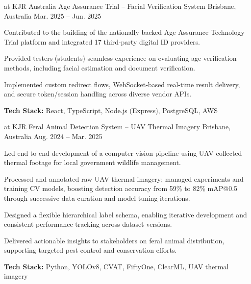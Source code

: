 
\begin{cventries}

  \cventry
    {at KJR} %
    {Australia Age Assurance Trial – Facial Verification System} %
    {Brisbane, Australia} %
    {Mar. 2025 – Jun. 2025} %
    {
      \begin{cvitems}
        \item {Contributed to the building of the nationally backed Age Assurance Technology Trial platform and integrated 17 third-party digital ID providers.}
        \item {Provided testers (students) seamless experience on evaluating age verification methods, including facial estimation and document verification.}  
        \item {Implemented custom redirect flows, WebSocket-based real-time result delivery, and secure token/session handling across diverse vendor APIs.}
        \item {\textbf{Tech Stack:} React, TypeScript, Node.js (Express), PostgreSQL, AWS}
      \end{cvitems}
    }

  \cventry
    {at KJR} %
    {Feral Animal Detection System – UAV Thermal Imagery} %
    {Brisbane, Australia} %
    {Aug. 2024 – Mar. 2025} %
    {
      \begin{cvitems}
        \item {Led end-to-end development of a computer vision pipeline using UAV-collected thermal footage for local government wildlife management.}
        \item {Processed and annotated raw UAV thermal imagery; managed experiments and training CV models, boosting detection accuracy from 59\% to 82\% mAP@0.5 through successive data curation and model tuning iterations.}
        \item {Designed a flexible hierarchical label schema, enabling iterative development and consistent performance tracking across dataset versions.}
        \item {Delivered actionable insights to stakeholders on feral animal distribution, supporting targeted pest control and conservation efforts.}
        \item {\textbf{Tech Stack:} Python, YOLOv8, CVAT, FiftyOne, ClearML, UAV thermal imagery}
      \end{cvitems}
    }


\end{cventries}
